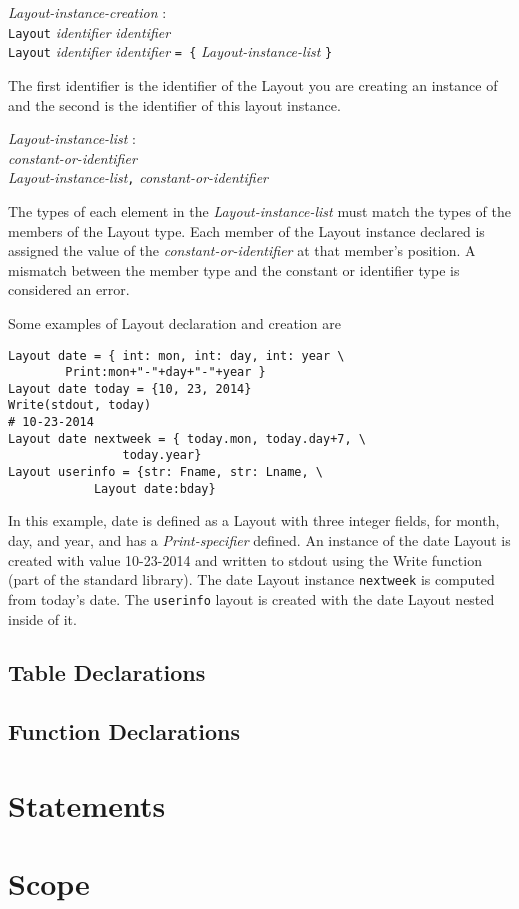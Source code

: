 \documentclass{article}
\begin{document}
\begin{tabbing}
	\= \emph{Layout}\=\emph{-instance-creation} : \\
		\> \> \texttt{Layout} \emph{identifier} \emph{identifier} \\
		\>\> \texttt{Layout} \emph{identifier} \emph{identifier} \texttt{= \{} \emph{Layout-instance-list} \texttt{\}}
\end{tabbing}
The first identifier is the identifier of the Layout you are creating an instance of and the second is the identifier of this layout instance. 
\begin{tabbing}
	\= \emph{Layout}\=\emph{-instance-list} : \\
		\> \> \emph{constant-or-identifier} \\
		\>\> \emph{Layout-instance-list}\texttt{,} \emph{constant-or-identifier}
\end{tabbing}
The types of each element in the \emph{Layout-instance-list} must match the types of the members of the Layout type. Each member of the Layout instance declared is assigned the value of the \emph{constant-or-identifier} at that member's position. A mismatch between the member type and the constant or identifier type is considered an error.

Some examples of Layout declaration and creation are

\begin{lstlisting}
Layout date = { int: mon, int: day, int: year \
		Print:mon+"-"+day+"-"+year }
Layout date today = {10, 23, 2014}
Write(stdout, today)
# 10-23-2014
Layout date nextweek = { today.mon, today.day+7, \
				today.year}
Layout userinfo = {str: Fname, str: Lname, \		
			Layout date:bday}
\end{lstlisting}
In this example, date is defined as a Layout with three integer fields, for month, day, and year, and has a \emph{Print-specifier} defined. An instance of the date Layout is created with value 10-23-2014 and written to stdout using the Write function (part of the standard library). The date Layout instance \texttt{nextweek} is computed from today's date. The \texttt{userinfo} layout is created with the date Layout nested inside of it. 

\subsection{Table Declarations}

\subsection{Function Declarations}
\label{sec:funcdec}

\section{Statements}


\section{Scope}
\end{document}
